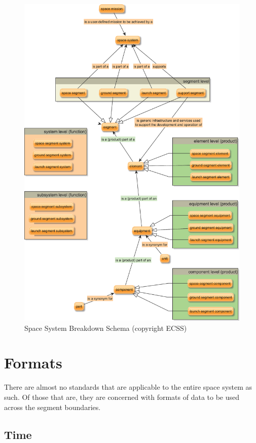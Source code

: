 \begin{figure}[h]
\centering\includegraphics[width=1.0\linewidth]{fig/system_decomposition}
\caption{Space System Breakdown Schema (copyright ECSS)}
\label{fig:Space System Breakdown Schema}
\end{figure}

\section{Formats}

There are almost no standards that are applicable to the entire space system as such. Of those that are, they are concerned with formats of data to be used across the segment boundaries.

\subsection{Time}

